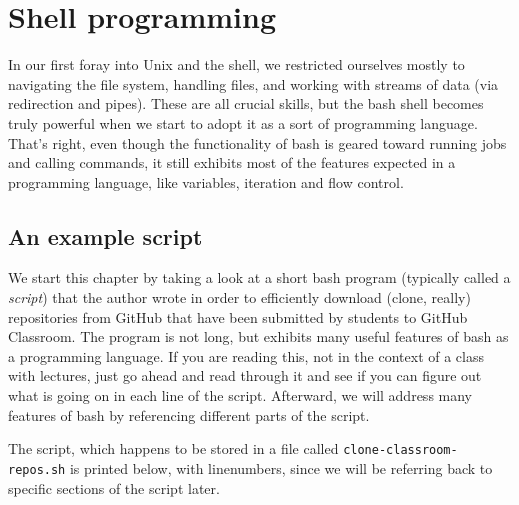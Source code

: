 \documentclass[]{krantz}
\begin{document}
\hypertarget{shell-programming}{%
\chapter{Shell programming}\label{shell-programming}}

In our first foray into Unix and the shell, we restricted ourselves mostly
to navigating the file system, handling files, and working with streams of data
(via redirection and pipes). These are all crucial skills, but the bash shell
becomes truly powerful when we start to adopt it as a sort of programming language.
That's right, even though the functionality of bash is geared toward running jobs
and calling commands, it still exhibits most of the features expected in a programming
language, like variables, iteration and flow control.

\hypertarget{an-example-script}{%
\section{An example script}\label{an-example-script}}

We start this chapter by taking a look at a short bash program (typically
called a \emph{script}) that the author wrote in order to efficiently download
(clone, really) repositories from GitHub that have been submitted by
students to GitHub Classroom. The program is not long, but exhibits
many useful features of bash as a programming language. If you are reading
this, not in the context of a class with lectures, just go ahead and read
through it and see if you can figure out what is going on in each line
of the script. Afterward, we will address many features of bash by
referencing different parts of the script.

The script, which happens to be stored in a file called \texttt{clone-classroom-repos.sh}
is printed below, with linenumbers, since we will
be referring back to specific sections of the script later.
\end{document}
